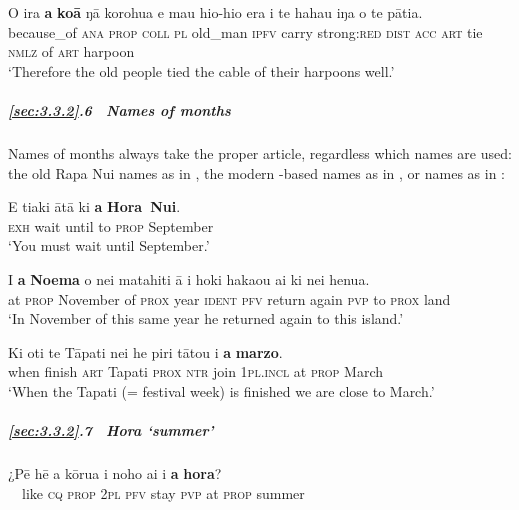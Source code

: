 \ea\label{ex:3.77}
\gll {\ꞌ}O ira \textbf{a} \textbf{koā} ŋā korohu{\ꞌ}a e ma{\ꞌ}u hio-hio era  i te haha{\ꞌ}u iŋa o te pātia.\\
because\_of \textsc{ana} \textsc{prop} \textsc{coll} \textsc{pl} old\_man \textsc{ipfv} carry strong:\textsc{red} \textsc{dist}  \textsc{acc} \textsc{art} tie \textsc{nmlz} of \textsc{art} harpoon\\

\glt 
‘Therefore the old people tied the cable of their harpoons well.’ \textstyleExampleref{[R360.020]} 
\z

\subparagraph{\ref{sec:3.3.2}.6~ Names of months} Names of months always take the proper article, regardless which names are used: the old Rapa Nui names as in , the modern -based names as in , or  names as in :

\ea\label{ex:3.78}
\gll E tiaki {\ꞌ}ātā ki \textbf{a} \textbf{Hora~Nui}.  \\
\textsc{exh} wait until to \textsc{prop} September  \\

\glt 
‘You must wait until September.’ \textstyleExampleref{[R647.238]} 
\z

\ea\label{ex:3.79}
\gll {\ꞌ}I \textbf{a} \textbf{Noema} o nei matahiti {\ꞌ}ā i hoki haka{\ꞌ}ou ai ki nei henua. \\
at \textsc{prop} November of \textsc{prox} year \textsc{ident} \textsc{pfv} return again \textsc{pvp} to \textsc{prox} land \\

\glt 
‘In November of this same year he returned again to this island.’ \textstyleExampleref{[R343.016]} 
\z

\ea\label{ex:3.80}
\gll Ki oti te Tāpati nei he piri tātou {\ꞌ}i \textbf{a} \textbf{marzo}. \\
when finish \textsc{art} Tapati \textsc{prox} \textsc{ntr} join \textsc{1pl.incl} at \textsc{prop} March \\

\glt 
‘When the Tapati (= festival week) is finished we are close to March.’ \textstyleExampleref{[R625.131]} 
\z

\subparagraph{\ref{sec:3.3.2}.7~ \textit{Hora} ‘summer’}

\ea\label{ex:3.81}
\gll ¿Pē hē a kōrua i noho ai {\ꞌ}i \textbf{a} \textbf{hora}? \\
~~like \textsc{cq} \textsc{prop} \textsc{2pl} \textsc{pfv} stay \textsc{pvp} at \textsc{prop} summer \\

